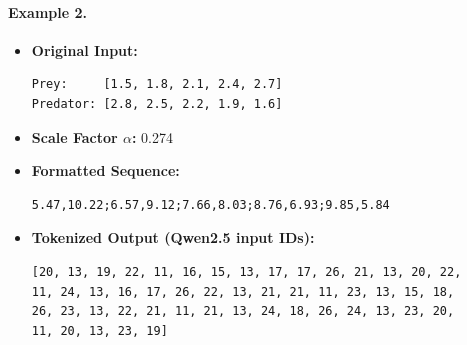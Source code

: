 \documentclass[a4paper,12pt]{article}
\begin{document}
\paragraph{Example 2.}
\begin{itemize}
  \item \textbf{Original Input:}
  \begin{verbatim}
Prey:     [1.5, 1.8, 2.1, 2.4, 2.7]
Predator: [2.8, 2.5, 2.2, 1.9, 1.6]
  \end{verbatim}

  \vspace{-0.7cm}

  \item \textbf{Scale Factor $\alpha$:} 0.274

  \item \textbf{Formatted Sequence:}
  \begin{verbatim}
5.47,10.22;6.57,9.12;7.66,8.03;8.76,6.93;9.85,5.84
  \end{verbatim}

  \vspace{-0.7cm}

  \item \textbf{Tokenized Output (Qwen2.5 input IDs):}
  \begin{verbatim}
[20, 13, 19, 22, 11, 16, 15, 13, 17, 17, 26, 21, 13, 20, 22,
11, 24, 13, 16, 17, 26, 22, 13, 21, 21, 11, 23, 13, 15, 18,
26, 23, 13, 22, 21, 11, 21, 13, 24, 18, 26, 24, 13, 23, 20,
11, 20, 13, 23, 19]
  \end{verbatim}
\end{itemize}
\end{document}
